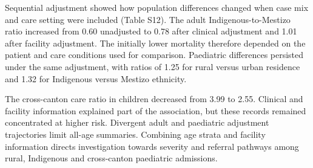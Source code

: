 \documentclass[11pt,a4paper]{article}
\begin{document}
Sequential adjustment showed how population differences changed when case mix and care setting were included (Table S12). The adult Indigenous-to-Mestizo ratio increased from 0.60 unadjusted to 0.78 after clinical adjustment and 1.01 after facility adjustment. The initially lower mortality therefore depended on the patient and care conditions used for comparison. Paediatric differences persisted under the same adjustment, with ratios of 1.25 for rural versus urban residence and 1.32 for Indigenous versus Mestizo ethnicity.

The cross-canton care ratio in children decreased from 3.99 to 2.55. Clinical and facility information explained part of the association, but these records remained concentrated at higher risk. Divergent adult and paediatric adjustment trajectories limit all-age summaries. Combining age strata and facility information directs investigation towards severity and referral pathways among rural, Indigenous and cross-canton paediatric admissions.
\end{document}
